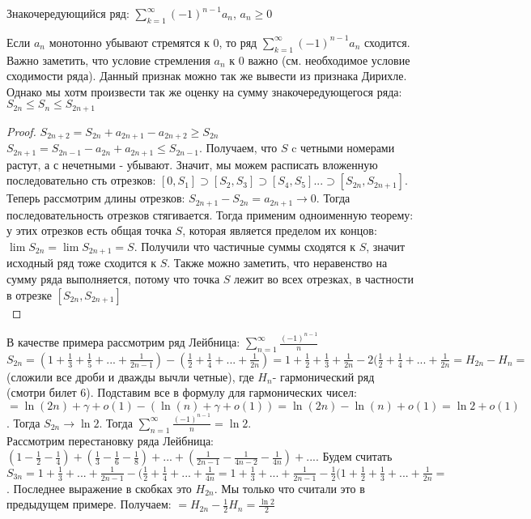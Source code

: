 
Знакочередующийся ряд: $\sum_{k=1}^{\infty} (-1)^{n-1}a_n$, $a_n \ge 0$

\begin{theorem}\thmslashn

Если $a_n$ монотонно убывают стремятся к 0, то ряд $\sum_{k=1}^{\infty} (-1)^{n-1}a_n$ сходится. Важно заметить, что условие стремления $a_n$ к 0 важно (см. необходимое условие сходимости ряда). Данный признак можно так же вывести из признака Дирихле. Однако мы хотм произвести так же оценку на сумму знакочередующегося ряда: $S_{2n} \le S_n \le S_{2n+1}$
\end{theorem}

\begin{proof}\thmslashn

$S_{2n+2}=S_{2n}+a_{2n+1}-a_{2n+2} \ge S_{2n}$
 $S_{2n+1}=S_{2n-1}-a_{2n}+a_{2n+1} \le S_{2n-1}$. Получаем, что $S$ c четными номерами растут, а с нечетными - убывают. Значит, мы можем расписать вложенную последовательно	сть отрезков: $[0,S_1] \supset [S_2,S_3] \supset [S_4,S_5]... \supset [S_{2n}, S_{2n+1}]$.\\ Теперь рассмотрим длины отрезков: $S_{2n+1}-S_{2n}=a_{2n+1} \to 0$. Тогда последовательность отрезков стягивается. Тогда применим одноименную теорему: у этих отрезков есть общая точка $S$, которая является пределом их концов: $\lim S_{2n} = \lim S_{2n+1} = S$. Получили что частичные суммы сходятся к $S$, значит исходный ряд тоже сходится к $S$. Также можно заметить, что неравенство на сумму ряда выполняется, потому что точка  $S$ лежит во всех отрезках, в частности в отрезке $[S_{2n}, S_{2n+1}]$\\
\end{proof}

\begin{example}\thmslashn

 В качестве примера рассмотрим ряд Лейбница: $\sum_{n=1}^\infty \frac{(-1)^{n-1}}{n} $ \\
 $S_{2n} = (1+ \frac{1}{3} + \frac{1}{5} + ... + \frac{1}{2n-1})-(\frac{1}{2}+ \frac{1}{4}+... + \frac{1}{2n}) = 1+ \frac{1}{2}+ \frac{1}{3}+ \frac{1}{2n} -2(\frac{1}{2}+\frac{1}{4}+...+ \frac{1}{2n}=H_{2n}-H_n=$ (сложили все дроби и дважды вычли четные), где $H_n$- гармонический ряд (смотри билет 6). Подставим все в формулу для гармонических чисел: $=\ln(2n)+ \gamma +o(1)-(\ln(n) + \gamma + o(1)) = \ln(2n) - \ln(n) + o(1) = \ln 2 + o(1)$. Тогда $S_{2n} \to \ln 2$. Тогда $\sum_{n=1}^\infty \frac{(-1)^{n-1}}{n}= \ln 2 $. \\
 Рассмотрим перестановку ряда Лейбница: $(1-\frac{1}{2}-\frac{1}{4})+(\frac{1}{3}-\frac{1}{6}-\frac{1}{8})+...+(\frac{1}{2n-1}-\frac{1}{4n-2}-\frac{1}{4n})+...$.
Будем считать $S_{3n} = 1+\frac{1}{3} + ... +\frac{1}{2n-1} -(\frac{1}{2}+\frac{1}{4}+...+\frac{1}{4n} = 1+\frac{1}{3} + ... +\frac{1}{2n-1} -\frac{1}{2}(1+\frac{1}{2}+\frac{1}{3}+...+\frac{1}{2n}=$. Последнее выражение в скобках это $H_{2n}$. Мы только что считали это в предыдущем примере. Получаем: $=H_{2n}-\frac{1}{2}H_n=\frac{\ln 2}{2}$
\end{example}
